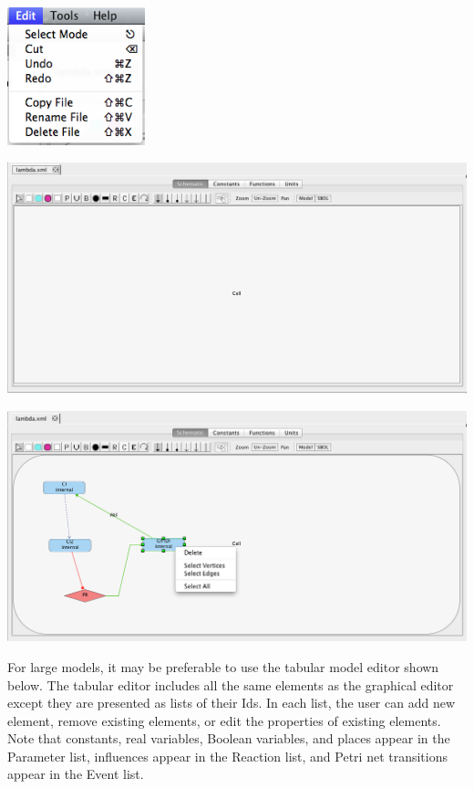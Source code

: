 \documentclass[titlepage,11pt]{article}
\begin{document}
\begin{center}
\includegraphics[width=40mm]{screenshots/editMenu}
\end{center}

\begin{center}
\includegraphics[width=160mm]{screenshots/ModelEditor}
\end{center}

\begin{center}
\includegraphics[width=160mm]{screenshots/deleteSelect}
\end{center}

For large models, it may be preferable to use the tabular model editor shown below.  The tabular editor includes all the same elements as the graphical editor except they are presented as lists of their Ids.  In each list, the user can add new element, remove existing elements, or edit the properties of existing elements.  Note that constants, real variables, Boolean variables, and places appear in the Parameter list, influences appear in the Reaction list, and Petri net transitions appear in the Event list.
\end{document}
